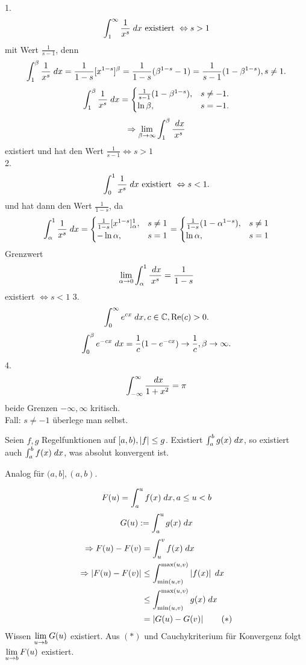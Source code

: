 \documentclass[../ana2.tex]{subfiles}
\begin{document}
\begin{bsp}
    1.
    \[ \integral{\frac{1}{x^s}}{1}{\infty} 
    \text{ existiert } \Leftrightarrow s > 1 \]
    mit Wert \( \frac{1}{s-1} \), denn 
    \[ \integral{\frac{1}{x^s}}{1}{\beta} 
    = \frac{1}{1-s} [x^{1-s}]^\beta 
    = \frac{1}{1-s} (\beta^{1-s} - 1)
    = \frac{1}{s-1} (1 - \beta^{1-s}), s \neq 1. \]
    \[ \integral{\frac{1}{x^s}}{1}{\beta} 
    = \begin{cases}
        \frac{1}{s-1}(1 - \beta^{1-s}), &s \neq -1.\\
        \ln \beta, &s = -1.
    \end{cases} \]
    \[ \Rightarrow \limes{\beta} \int_1^\beta \frac{\dx}{x^s} \]
    existiert und hat den Wert 
    \( \frac{1}{s-1} \Leftrightarrow s > 1 \) \\
    2.
    \[ \integral{\frac{1}{x^s}}{0}{1} 
    \text{ existiert } \Leftrightarrow s < 1. \]
    und hat dann den Wert \( \frac{1}{1-s} \), da
    \[ \integral{\frac{1}{x^s}}{\alpha}{1} 
    = \begin{cases}
        \frac{1}{1-s} [x^{1-s}]_\alpha^1, &s \neq 1\\
        -\ln \alpha, &s = 1
    \end{cases}
    = \begin{cases}
        \frac{1}{1-s} (1-\alpha^{1-s}), &s \neq 1\\
        \ln \alpha, &s = 1
    \end{cases} \]    
    Grenzwert
    \[ \limesx{\alpha}{0} \int_\alpha^1 \frac{\dx}{x^s} = \frac{1}{1-s} \]
    existiert \( \Leftrightarrow s < 1 \)
    3.
    \[ \integral{e^{cx}}{0}{\infty}, c\in\C, \Re(c) > 0. \]    
    \[ \integral{e^{-cx}}{0}{\beta} 
    = \frac{1}{c} (1-e^{-cx}) \rightarrow \frac{1}{c}, 
    \beta \rightarrow \infty. \]
    4. 
    \[ \int_{-\infty}^\infty \frac{\dx}{1+x^2} = \pi \]
    beide Grenzen \( -\infty, \infty \) kritisch. \\
    Fall: \(s \neq -1\) überlege man selbst.
\end{bsp}
\begin{satz}[Majorantenkriterium]
    Seien \( f,g \) Regelfunktionen auf 
    \( [a,b), \abs{f} \leq g \). 
    Existiert \( \integral{g(x)}{a}{b} \), so existiert 
    auch \( \integral{f(x)}{a}{b} \), was 
    absolut konvergent ist.
\end{satz}
\begin{bem}
    Analog für \( (a,b], (a,b) \).
\end{bem}
\begin{bew}
    \[ F(u) = \integral{f(x)}{a}{u}, a \leq u < b \]
    \[ G(u) := \integral{g(x)}{a}{u} \]
    \begin{align*}
        \Rightarrow F(u) - F(v) 
        &= \integral{f(x)}{u}{v}  \\
        \Rightarrow \abs{F(u) - F(v)} 
        &\leq \integral{\abs{f(x)}}{\min(u,v)}{\max(u,v)} \\
        &\leq \integral{g(x)}{\min(u,v)}{\max(u,v)} \\
        &= \abs{G(u) - G(v)} \tag{\(*\)}
    \end{align*}
    Wissen \( \limesx{u}{b} G(u) \) existiert.
    Aus \( (*) \) und Cauchykriterium für Konvergenz 
    folgt \( \limesx{u}{b} F(u) \) existiert.
\end{bew}
\end{document}
